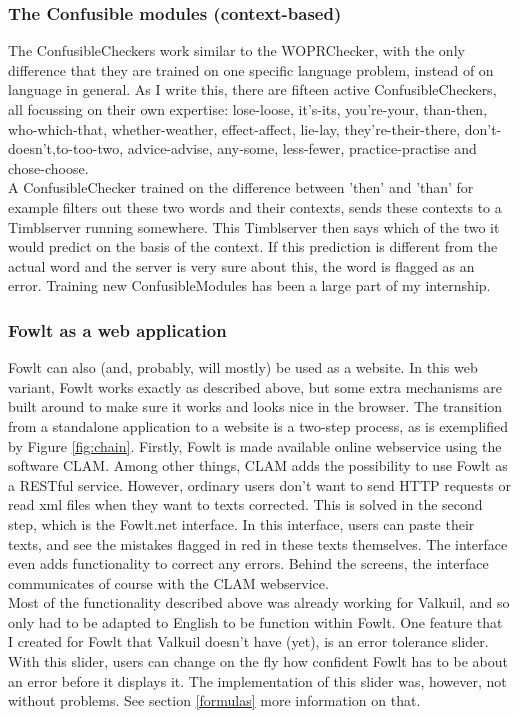 \documentclass[12pt]{article}
\begin{document}
\subsubsection{The Confusible modules (context-based)}
The ConfusibleCheckers work similar to the WOPRChecker, with the only difference that they are trained on one specific language problem, instead of on language in general. As I write this, there are fifteen active ConfusibleCheckers, all focussing on their own expertise: lose-loose, it's-its, you're-your, than-then, who-which-that, whether-weather, effect-affect, lie-lay, they're-their-there, don't-doesn't,to-too-two, advice-advise, any-some, less-fewer, practice-practise and chose-choose.
\\\indent
A ConfusibleChecker trained on the difference between 'then' and 'than' for example filters out these two words and their contexts, sends these contexts to a Timblserver running somewhere. This Timblserver then says which of the two it would predict on the basis of the context. If this prediction is different from the actual word and the server is very sure about this, the word is flagged as an error. Training new ConfusibleModules has been a large part of my internship.

\subsubsection{Fowlt as a web application}
Fowlt can also (and, probably, will mostly) be used as a website. In this web variant, Fowlt works exactly as described above, but some extra mechanisms are built around to make sure it works and looks nice in the browser. The transition from a standalone application to a website is a two-step process, as is exemplified by Figure \ref{fig:chain}. Firstly, Fowlt is made available online webservice using the software CLAM. Among other things, CLAM adds the possibility to use Fowlt as a RESTful service. However, ordinary users don't want to send HTTP requests or read xml files when they want to texts corrected. This is solved in the second step, which is the Fowlt.net interface. In this interface, users can paste their texts, and see the mistakes flagged in red in these texts themselves. The interface even adds functionality to correct any errors. Behind the screens, the interface communicates of course with the CLAM webservice.
\\\indent
Most of the functionality described above was already working for Valkuil, and so only had to be adapted to English to be function within Fowlt. One feature that I created for Fowlt that Valkuil doesn't have (yet), is an error tolerance slider. With this slider, users can change on the fly how confident Fowlt has to be about an error before it displays it. The implementation of this slider was, however, not without problems. See section \ref{formulas} more information on that.
\end{document}
